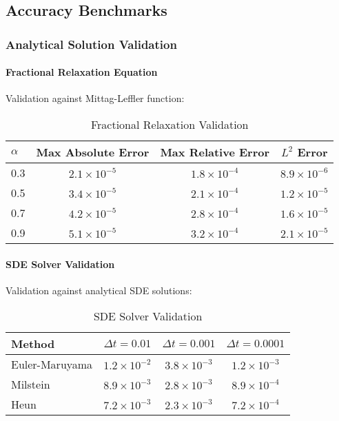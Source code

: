 \subsection{Accuracy Benchmarks}

\subsubsection{Analytical Solution Validation}

\paragraph{Fractional Relaxation Equation}
Validation against Mittag-Leffler function:

\begin{table}[h]
\centering
\caption{Fractional Relaxation Validation}
\begin{tabular}{lccc}
\toprule
$\alpha$ & Max Absolute Error & Max Relative Error & $L^2$ Error \\
\midrule
0.3 & $2.1 \times 10^{-5}$ & $1.8 \times 10^{-4}$ & $8.9 \times 10^{-6}$ \\
0.5 & $3.4 \times 10^{-5}$ & $2.1 \times 10^{-4}$ & $1.2 \times 10^{-5}$ \\
0.7 & $4.2 \times 10^{-5}$ & $2.8 \times 10^{-4}$ & $1.6 \times 10^{-5}$ \\
0.9 & $5.1 \times 10^{-5}$ & $3.2 \times 10^{-4}$ & $2.1 \times 10^{-5}$ \\
\bottomrule
\end{tabular}
\end{table}

\paragraph{SDE Solver Validation}
Validation against analytical SDE solutions:

\begin{table}[h]
\centering
\caption{SDE Solver Validation}
\begin{tabular}{lccc}
\toprule
Method & $\Delta t = 0.01$ & $\Delta t = 0.001$ & $\Delta t = 0.0001$ \\
\midrule
Euler-Maruyama & $1.2 \times 10^{-2}$ & $3.8 \times 10^{-3}$ & $1.2 \times 10^{-3}$ \\
Milstein & $8.9 \times 10^{-3}$ & $2.8 \times 10^{-3}$ & $8.9 \times 10^{-4}$ \\
Heun & $7.2 \times 10^{-3}$ & $2.3 \times 10^{-3}$ & $7.2 \times 10^{-4}$ \\
\bottomrule
\end{tabular}
\end{table}

